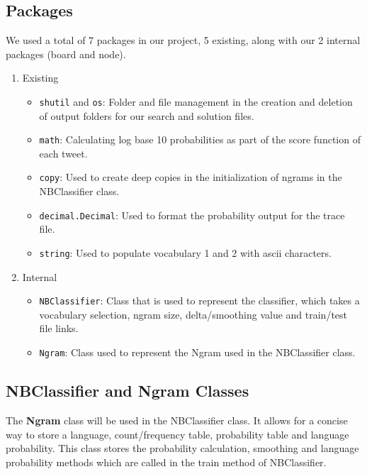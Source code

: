\documentclass[runningheads]{llncs}
\begin{document}
\subsection{Packages}

We used a total of 7 packages in our project, 5 existing, along with our 2 internal packages (board and node). 

\begin{enumerate}
    \item Existing 
    \begin{itemize}
        \item \verb|shutil| and \verb|os|: Folder and file management in the creation and deletion of output folders for our search and solution files. 
        \item \verb|math|: Calculating log base 10 probabilities as part of the score function of each tweet.
        \item \verb|copy|: Used to create deep copies in the initialization of ngrams in the NBClassifier class.
        \item \verb|decimal.Decimal|: Used to format the probability output for the trace file.
        \item \verb|string|: Used to populate vocabulary 1 and 2 with ascii characters.
    \end{itemize}
    \item Internal
    \begin{itemize}
        \item \verb|NBClassifier|: Class that is used to represent the classifier, which takes a vocabulary selection, ngram size, delta/smoothing value and train/test file links.
        \item \verb|Ngram|: Class used to represent the Ngram used in the NBClassifier class. 
    \end{itemize}
\end{enumerate}

\subsection{NBClassifier and Ngram Classes}

The \textbf{Ngram} class will be used in the NBClassifier class. It allows for a concise way to store a language, count/frequency table, probability table and language probability. This class stores the probability calculation, smoothing and language probability methods which are called in the train method of NBClassifier.
\end{document}
